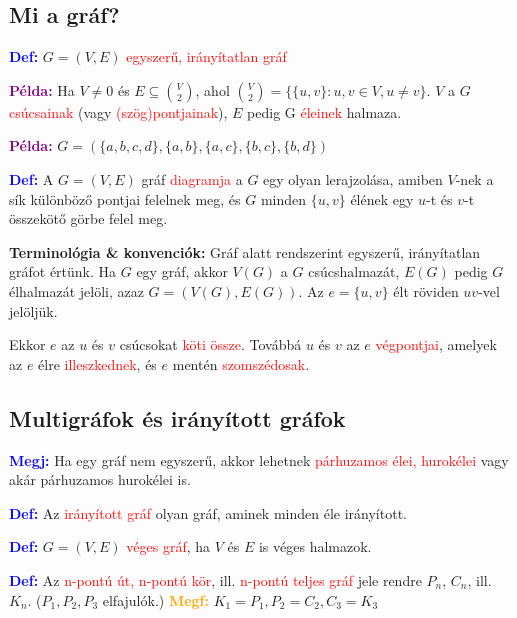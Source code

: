 \documentclass[../szamtud.tex]{subfiles}
\begin{document}
    \subsection{Mi a gráf?}
			
        \textcolor{blue}{\textbf{Def:}} $G = (V,E)$ \textcolor{red}{egyszerű, irányítatlan gráf}
        
        \textcolor{purple}{\textbf{Példa:}} Ha $ V \neq 0$ és $E \subseteq \binom{V}{2}$, ahol $\binom{V}{2} = \{\{u,v\} : u,v \in V, u \neq v\}$. $V$ a $G$ \textcolor{red}{csúcsainak} (vagy \textcolor{red}{(szög)pontjainak}), $E$ pedig G \textcolor{red}{éleinek} halmaza. 
        
        \textcolor{purple}{\textbf{Példa:}} $G = (\{a,b,c,d\},\{a,b\},\{a,c\},\{b,c\},\{b,d\})$
        
        \textcolor{blue}{\textbf{Def:}} A $G = (V,E)$ gráf \textcolor{red}{diagramja} a $G$ egy olyan lerajzolása, amiben $V$-nek a sík különböző pontjai felelnek meg, és $G$ minden $\{u,v\}$ élének egy $u$-t és $v$-t összekötő görbe felel meg.
        
        \textbf{Terminológia \& konvenciók:} Gráf alatt rendszerint egyszerű, irányítatlan gráfot értünk. Ha $G$ egy gráf, akkor $V(G)$ a $G$ csúcshalmazát, $E(G)$ pedig $G$ élhalmazát jelöli, azaz $G = (V(G),E(G))$. Az $e = \{u,v\}$ élt röviden $uv$-vel jelöljük. 
        
        Ekkor $e$ az $u$ és $v$ csúcsokat \textcolor{red}{köti össze}. Továbbá $u$ és $v$ az $e$ \textcolor{red}{végpontjai}, amelyek az $e$ élre \textcolor{red}{illeszkednek}, és $e$ mentén \textcolor{red}{szomszédosak}.
    
    \subsection{Multigráfok és irányított gráfok}

        \textcolor{blue}{\textbf{Megj:}} Ha egy gráf nem egyszerű, akkor lehetnek \textcolor{red}{párhuzamos élei, hurokélei} vagy akár párhuzamos hurokélei is.
        
        \textcolor{blue}{\textbf{Def:}} Az \textcolor{red}{irányított gráf} olyan gráf, aminek minden éle irányított.

        \textcolor{blue}{\textbf{Def:}} $G = (V,E)$ \textcolor{red}{véges gráf}, ha $V$ és $E$ is véges halmazok.

        \textcolor{blue}{\textbf{Def:}} Az \textcolor{red}{n-pontú út, n-pontú kör}, ill. \textcolor{red}{n-pontú teljes gráf} jele rendre $P_n$, $C_n$, ill. $K_n$. ($P_1,P_2,P_3$ elfajulók.) \textcolor{orange}{\textbf{Megf:}} $K_1 = P_1, P_2=C_2, C_3=K_3$
\end{document}
